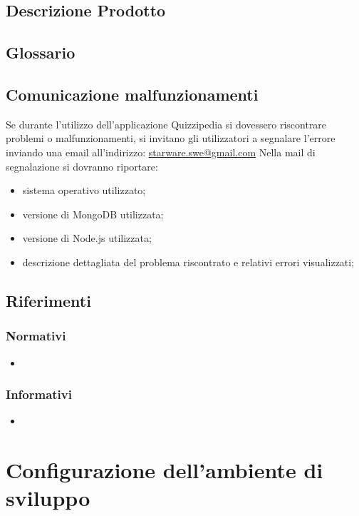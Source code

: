 \documentclass[12pt,a4paper]{article}
\begin{document}
	\subsection{Descrizione Prodotto}
	\descrizioneProdotto
	
	\subsection{Glossario}
	\glossarioPrint
	\subsection{Comunicazione malfunzionamenti}
		Se durante l’utilizzo dell’applicazione Quizzipedia si dovessero riscontrare problemi o
		malfunzionamenti, si invitano gli utilizzatori a segnalare l’errore inviando una email
		all’indirizzo:
		\url{starware.swe@gmail.com}
		Nella mail di segnalazione si dovranno riportare:
		\begin{itemize}
			\item sistema operativo utilizzato;
			\item versione di MongoDB utilizzata;
			\item versione di Node.js utilizzata;
			\item descrizione dettagliata del problema riscontrato e relativi errori visualizzati;
		\end{itemize}
	\subsection{Riferimenti}
	
	\subsubsection{Normativi}
	\begin{itemize}
		\item \TODO{}
		
	\end{itemize}
	
	\subsubsection{Informativi}
	\begin{itemize}
		\item \TODO{}
	\end{itemize}
	
	\newpage
	\section{Configurazione dell'ambiente di sviluppo}
\end{document}
